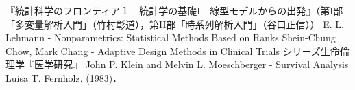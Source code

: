 \documentclass[uplatex,dvipdfmx]{jsreport}
\begin{document}
\begin{thebibliography}{99}
    『統計科学のフロンティア１　統計学の基礎I　線型モデルからの出発』（第I部「多変量解析入門」（竹村彰道），第II部「時系列解析入門」（谷口正信））
    E. L. Lehmann - Nonparametrics: Statistical Methods Based on Ranks
    Shein-Chung Chow, Mark Chang - Adaptive Design Methods in Clinical Trials
    シリーズ生命倫理学『医学研究』
    John P. Klein and Melvin L. Moeschberger - Survival Analysis
    Luisa T. Fernholz.  (1983)．
\end{thebibliography}
\end{document}
